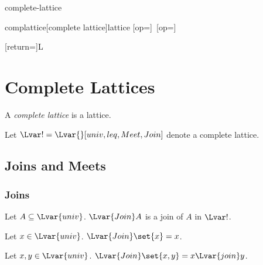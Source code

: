 \documentclass{stex}
\begin{document}
\begin{smodule}{complete-lattice}

  \STEXexport{
    \let\Join\relax
  }

  \begin{extstructure}{complattice}[complete lattice]{lattice}
    [op=\bigvee]{\bigvee\,}
    [op=\bigwedge]{\bigwedge\,}
  \end{extstructure}

  [return={\complattice[comp=##1]}]{\mathcal L}

  \section{Complete Lattices}

  \begin{forthel}
  \end{forthel}
  
  \begin{forthel}
    \begin{signature*}
      A \emph{complete lattice} is a lattice.
    \end{signature*}

    Let $\Lvar! = \Lvar{}[univ,leq,Meet,Join]$ denote a complete lattice.
  \end{forthel}
  
  \subsection{Joins and Meets}

  \subsubsection{Joins}
  
  \begin{forthel}
    \begin{signature*}
      Let $A \subseteq \Lvar{univ}$.
      ${\Lvar{Join}} A$ is a join of $A$ in $\Lvar!$.
    \end{signature*}
    
    \begin{proposition*}
      Let $x \in \Lvar{univ}$.
      ${\Lvar{Join}} \set{x} = x$.
    \end{proposition*}
    
    \begin{proposition*}
      Let $x, y \in \Lvar{univ}$.
      ${\Lvar{Join}} \set{x,y} = x {\Lvar{join}} y$.
    \end{proposition*}
  \end{forthel}


\end{smodule}
\end{document}
